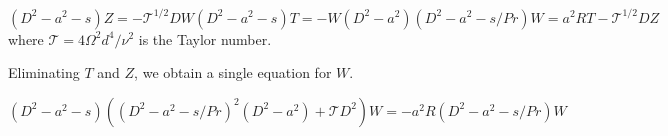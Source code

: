 \documentclass{article}
\begin{document}
\begin{subequations}\label{eq:2_3_amplitude}
 \begin{equation}
  (D^{2}-a^{2}-s)Z = -\mathcal{T}^{1/2}DW
 \end{equation}
 
 \begin{equation}
  (D^{2}-a^{2}-s) T = -W
 \end{equation}
 
 \begin{equation}
  (D^{2}-a^{2})(D^{2}-a^{2}-s/Pr)W = a^{2}RT - \mathcal{T}^{1/2}DZ
 \end{equation}
\end{subequations}
where $\mathcal{T} = 4\Omega^{2}d^{4}/\nu^{2}$ is the Taylor number.

Eliminating $T$ and $Z$, we obtain a single equation for $W$.

\begin{equation}
 (D^{2}-a^{2}-s)\left( (D^{2}-a^{2}-s/Pr)^{2}(D^{2}-a^{2}) + \mathcal{T}D^{2}\right)W = -a^{2}R (D^{2}-a^{2}-s/Pr)W
\end{equation}



 \if@openright\cleardoublepage\else\clearpage\fi
 \cleardoublepage
 \pagestyle{empty}
\end{document}
